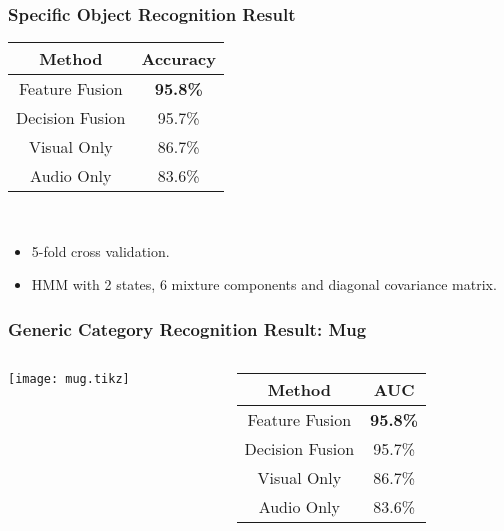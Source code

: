 \documentclass{beamer}
\begin{document}
  \begin{frame}
    \frametitle{Specific Object Recognition Result}

    \centering
    \begin{tabular}[h]{c|c}
      \hline
      Method & Accuracy \\ \hline \hline
      Feature Fusion & \textbf{95.8\%} \\ \hline
      Decision Fusion  & 95.7\% \\ \hline
      Visual Only & 86.7\% \\ \hline
      Audio Only & 83.6\% \\ \hline
    \end{tabular}
    ~
    \begin{itemize}
      \item 5-fold cross validation.
      \item HMM with 2 states, 6 mixture components and diagonal covariance matrix.
    \end{itemize}
  \end{frame}

  \begin{frame}
    \frametitle{Generic Category Recognition Result: Mug}
    
    \begin{columns}
      \begin{column}{.6\textwidth}
        \centering
        \footnotesize
        \texttt{[image: mug.tikz]}
      \end{column}
      \begin{column}{.4\textwidth}
        \footnotesize
        \begin{tabular}[h]{c|c}
          \hline
          Method & AUC \\ \hline \hline
          Feature Fusion & \textbf{95.8\%} \\ \hline
          Decision Fusion  & 95.7\% \\ \hline
          Visual Only & 86.7\% \\ \hline
          Audio Only & 83.6\% \\ \hline
        \end{tabular}
      \end{column}
    \end{columns}
  \end{frame}
\end{document}
